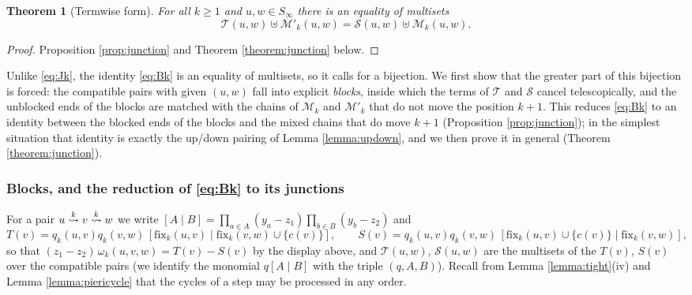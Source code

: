 \documentclass{amsart}
\newtheorem{theorem}[lemma]{Theorem}
\theoremstyle{definition}
\theoremstyle{remark}
\numberwithin{equation}{section}
\newcommand{\xrightsquigarrow}[2][]{%
	\mathrel{\mathop{\rightsquigarrow}\limits^{\scriptstyle #2}%
	\ifx\hfuzz#1\hfuzz\else_{\scriptstyle #1}\fi}%
}
\newcommand{\tom}[1]{\ensuremath{\xrightsquigarrow{#1}}}
\newcommand{\fx}{\mathrm{fix}}
\begin{document}
\begin{theorem}[Termwise form] \label{theorem:termwise}
For all $k\geq1$ and $u,w\in S_\infty$ there is an equality of multisets
\begin{equation}\label{eq:Bk}
\mathcal T(u,w)\uplus\mathcal M'_k(u,w)=\mathcal S(u,w)\uplus\mathcal M_k(u,w).\tag{$\mathrm B_k$}
\end{equation}
\end{theorem}
\begin{proof}
Proposition \ref{prop:junction} and Theorem \ref{theorem:junction} below.
\end{proof}

Unlike \eqref{eq:Jk}, the identity \eqref{eq:Bk} is an equality of multisets, so it calls for a bijection. We first show that the greater part of this bijection is forced: the compatible pairs with given $(u,w)$ fall into explicit \emph{blocks}, inside which the terms of $\mathcal T$ and $\mathcal S$ cancel telescopically, and the unblocked ends of the blocks are matched with the chains of $\mathcal M_k$ and $\mathcal M'_k$ that do not move the position $k+1$. This reduces \eqref{eq:Bk} to an identity between the blocked ends of the blocks and the mixed chains that do move $k+1$ (Proposition \ref{prop:junction}); in the simplest situation that identity is exactly the up/down pairing of Lemma \ref{lemma:updown}, and we then prove it in general (Theorem \ref{theorem:junction}).

\subsubsection*{Blocks, and the reduction of \eqref{eq:Bk} to its junctions}

For a pair $u\tom{k}v\tom{k}w$ we write $[A\mid B]=\prod_{a\in A}(y_a-z_1)\prod_{b\in B}(y_b-z_2)$ and
$$T(v)=q_k(u,v)q_k(v,w)\,[\fx_k(u,v)\mid\fx_k(v,w)\cup\{c(v)\}],\qquad S(v)=q_k(u,v)q_k(v,w)\,[\fx_k(u,v)\cup\{c(v)\}\mid\fx_k(v,w)],$$
so that $(z_1-z_2)\,\omega_k(u,v,w)=T(v)-S(v)$ by the display above, and $\mathcal T(u,w)$, $\mathcal S(u,w)$ are the multisets of the $T(v)$, $S(v)$ over the compatible pairs (we identify the monomial $q[A\mid B]$ with the triple $(q,A,B)$). Recall from Lemma \ref{lemma:tight}(iv) and Lemma \ref{lemma:piericycle} that the cycles of a step may be processed in any order.
\end{document}
